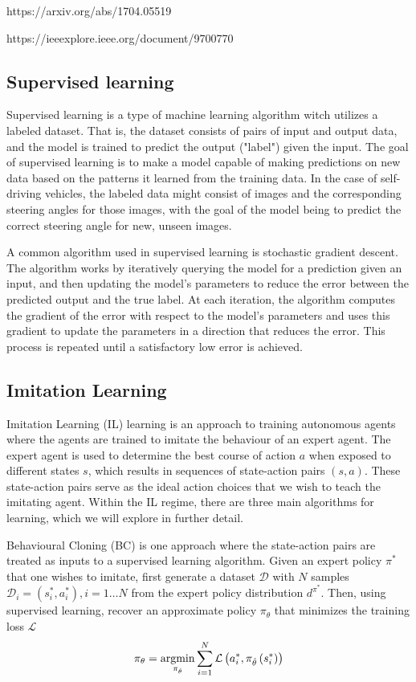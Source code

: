 https://arxiv.org/abs/1704.05519  \cite{computer-vision-for-autonomous-vehicles}

https://ieeexplore.ieee.org/document/9700770 \cite{survey-on-end-to-end-techniques}


\subsection{Supervised learning}
\label{sec:superviser-learning}
Supervised learning is a type of machine learning algorithm witch utilizes a labeled dataset.
That is, the dataset consists of pairs of input and output data,
and the model is trained to predict the output ("label") given the input.
The goal of supervised learning is to make a model
capable of making predictions on new data
based on the patterns it learned from the training data.
In the case of self-driving vehicles,
the labeled data might consist of images and the corresponding steering angles for those images,
with the goal of the model being to predict the correct steering angle for new,
unseen images.

A common algorithm used in supervised learning is stochastic gradient descent.
The algorithm works by iteratively querying the model for a prediction given an input,
and then updating the model's parameters to reduce the error between the predicted output and the true label.
At each iteration, the algorithm computes the gradient of the error with respect to the model's parameters and uses this gradient to update the parameters in a direction that reduces the error.
This process is repeated until a satisfactory low error is achieved.


\subsection{Imitation Learning}

Imitation Learning (IL) learning is an approach to training autonomous agents
where the agents are trained to imitate the behaviour of an expert agent.
The expert agent is used to determine the best course of action $a$ when exposed to different states $s$,
which results in sequences of state-action pairs $(s, a)$.
These state-action pairs serve as the ideal action choices
that we wish to teach the imitating agent.
Within the IL regime,
there are three main algorithms for learning,
which we will explore in further detail.

Behavioural Cloning (BC) is one approach where the state-action pairs
are treated as inputs to a supervised learning algorithm.
Given an expert policy $\pi^*$ that one wishes to imitate,
first generate a dataset $\mathcal{D}$
with $N$ samples $\mathcal{D}_i = (s^*_i, a^*_i), i = 1 \dots N$
from the expert policy distribution $d^{\pi^*}$.
Then, using supervised learning,
recover an approximate policy $\pi_\theta$
that minimizes the training loss $\mathcal{L}$
$$
\pi_\theta =
    \operatorname*{argmin}_{\pi_{\hat{\theta}}}
        \sum_{i=1}^{N}
            \mathcal{L} \left(a_i^*, \pi_{\hat{\theta}} \left(s_i^*\right) \right)
$$

